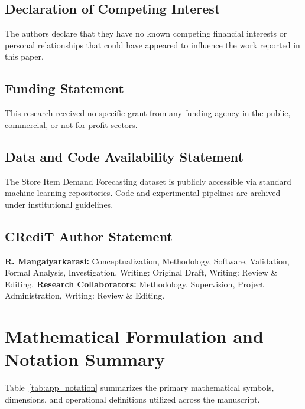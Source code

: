 \documentclass[11pt,a4paper]{article}
\begin{document}
\subsection*{Declaration of Competing Interest}
The authors declare that they have no known competing financial interests or personal relationships that could have appeared to influence the work reported in this paper.

\subsection*{Funding Statement}
This research received no specific grant from any funding agency in the public, commercial, or not-for-profit sectors.

\subsection*{Data and Code Availability Statement}
The Store Item Demand Forecasting dataset is publicly accessible via standard machine learning repositories. Code and experimental pipelines are archived under institutional guidelines.

\subsection*{CRediT Author Statement}
\textbf{R. Mangaiyarkarasi:} Conceptualization, Methodology, Software, Validation, Formal Analysis, Investigation, Writing: Original Draft, Writing: Review \& Editing. \textbf{Research Collaborators:} Methodology, Supervision, Project Administration, Writing: Review \& Editing.

\clearpage
\appendix
\section{Mathematical Formulation and Notation Summary}
\label{app:notation}

Table~\ref{tab:app_notation} summarizes the primary mathematical symbols, dimensions, and operational definitions utilized across the manuscript.
\end{document}
